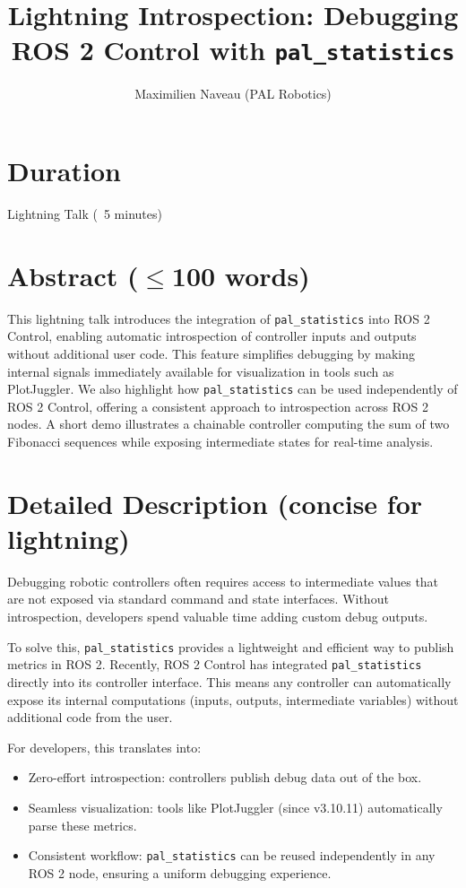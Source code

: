 \documentclass[11pt,a4paper]{article}
\title{Lightning Introspection: Debugging ROS 2 Control with \texttt{pal\_statistics}}
\author{Maximilien Naveau (PAL Robotics)}
\date{}
\begin{document}
\maketitle

\section*{Duration}
Lightning Talk (~5 minutes)

\section*{Abstract ($\leq$100 words)}
This lightning talk introduces the integration of \texttt{pal\_statistics} into ROS 2 Control, enabling automatic introspection of controller inputs and outputs without additional user code. This feature simplifies debugging by making internal signals immediately available for visualization in tools such as PlotJuggler. We also highlight how \texttt{pal\_statistics} can be used independently of ROS 2 Control, offering a consistent approach to introspection across ROS 2 nodes. A short demo illustrates a chainable controller computing the sum of two Fibonacci sequences while exposing intermediate states for real-time analysis.

\section*{Detailed Description (concise for lightning)}
Debugging robotic controllers often requires access to intermediate values that are not exposed via standard command and state interfaces. Without introspection, developers spend valuable time adding custom debug outputs.  

To solve this, \texttt{pal\_statistics} provides a lightweight and efficient way to publish metrics in ROS 2. Recently, ROS 2 Control has integrated \texttt{pal\_statistics} directly into its controller interface. This means any controller can automatically expose its internal computations (inputs, outputs, intermediate variables) without additional code from the user.  

For developers, this translates into:
\begin{itemize}
  \item Zero-effort introspection: controllers publish debug data out of the box.
  \item Seamless visualization: tools like PlotJuggler (since v3.10.11) automatically parse these metrics.
  \item Consistent workflow: \texttt{pal\_statistics} can be reused independently in any ROS 2 node, ensuring a uniform debugging experience.
\end{itemize}
\end{document}
